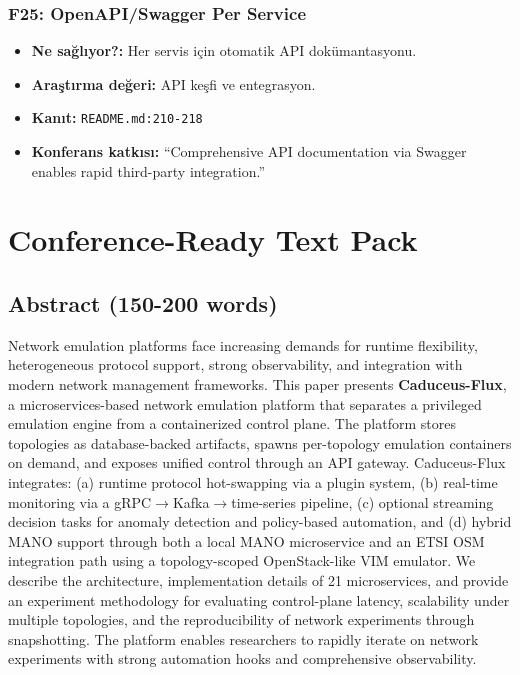 \documentclass[10pt,a4paper]{article}
\begin{document}
\subsubsection{F25: OpenAPI/Swagger Per Service}

\begin{itemize}
\item \textbf{Ne sağlıyor?:} Her servis için otomatik API dokümantasyonu.
\item \textbf{Araştırma değeri:} API keşfi ve entegrasyon.
\item \textbf{Kanıt:} \texttt{README.md:210-218}
\item \textbf{Konferans katkısı:} ``Comprehensive API documentation via Swagger enables rapid third-party integration.''
\end{itemize}

\section{Conference-Ready Text Pack}

\subsection{Abstract (150-200 words)}

Network emulation platforms face increasing demands for runtime flexibility, heterogeneous protocol support, strong observability, and integration with modern network management frameworks. This paper presents \textbf{Caduceus-Flux}, a microservices-based network emulation platform that separates a privileged emulation engine from a containerized control plane. The platform stores topologies as database-backed artifacts, spawns per-topology emulation containers on demand, and exposes unified control through an API gateway. Caduceus-Flux integrates: (a) runtime protocol hot-swapping via a plugin system, (b) real-time monitoring via a gRPC$\to$Kafka$\to$time-series pipeline, (c) optional streaming decision tasks for anomaly detection and policy-based automation, and (d) hybrid MANO support through both a local MANO microservice and an ETSI OSM integration path using a topology-scoped OpenStack-like VIM emulator. We describe the architecture, implementation details of 21 microservices, and provide an experiment methodology for evaluating control-plane latency, scalability under multiple topologies, and the reproducibility of network experiments through snapshotting. The platform enables researchers to rapidly iterate on network experiments with strong automation hooks and comprehensive observability.
\end{document}
